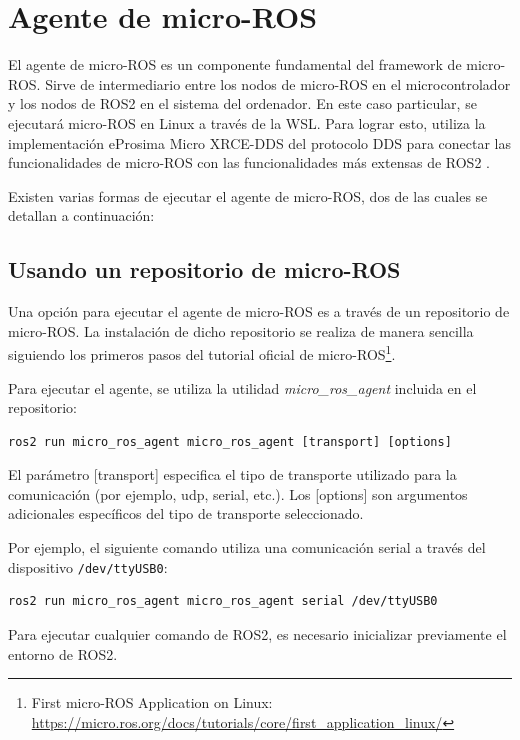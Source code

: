 \section{Agente de micro-ROS}
\label{section:microrosagent}

El agente de micro-ROS es un componente fundamental del framework de micro-ROS. Sirve de intermediario entre los nodos de micro-ROS en el microcontrolador y los nodos de ROS2 en el sistema del ordenador. En este caso particular, se ejecutará micro-ROS en Linux a través de la WSL. Para lograr esto, utiliza la implementación eProsima Micro XRCE-DDS del protocolo DDS para conectar las funcionalidades de micro-ROS con las funcionalidades más extensas de ROS2 \cite{MicroXRCE-DDS2023}.

Existen varias formas de ejecutar el agente de micro-ROS, dos de las cuales se detallan a continuación:

\subsection{Usando un repositorio de micro-ROS}

Una opción para ejecutar el agente de micro-ROS es a través de un repositorio de micro-ROS. La instalación de dicho repositorio se realiza de manera sencilla siguiendo los primeros pasos del tutorial oficial de micro-ROS\footnote{First micro-ROS Application on Linux: \url{https://micro.ros.org/docs/tutorials/core/first_application_linux/}}.

Para ejecutar el agente, se utiliza la utilidad \textit{micro\_ros\_agent} incluida en el repositorio:

\begin{verbatim}
ros2 run micro_ros_agent micro_ros_agent [transport] [options]
\end{verbatim}

El parámetro [transport] especifica el tipo de transporte utilizado para la comunicación (por ejemplo, udp, serial, etc.). Los [options] son argumentos adicionales específicos del tipo de transporte seleccionado.

Por ejemplo, el siguiente comando utiliza una comunicación serial a través del dispositivo \texttt{/dev/ttyUSB0}:

\begin{verbatim}
ros2 run micro_ros_agent micro_ros_agent serial /dev/ttyUSB0
\end{verbatim}

Para ejecutar cualquier comando de ROS2, es necesario inicializar previamente el entorno de ROS2.

